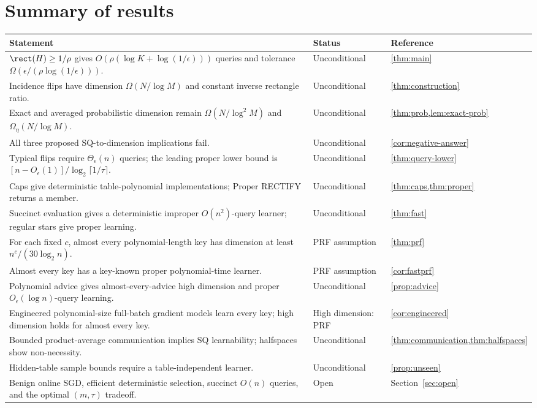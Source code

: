 \clearpage
\section*{Summary of results}
\begin{center}\small
\renewcommand{\arraystretch}{1.5}
\begin{tabularx}{\linewidth}{@{}X p{.20\linewidth}p{.14\linewidth}@{}}\toprule
Statement & Status & Reference\\\midrule
$\rect(H)\ge1/\rho$ gives $O(\rho(\log K+\log(1/\epsilon)))$ queries and tolerance $\Omega(\epsilon/(\rho\log(1/\epsilon)))$. & Unconditional & \cref{thm:main}\\
Incidence flips have dimension $\Omega(N/\log M)$ and constant inverse rectangle ratio. & Unconditional & \cref{thm:construction}\\
Exact and averaged probabilistic dimension remain $\Omega(N/\log^2M)$ and $\Omega_\eta(N/\log M)$. & Unconditional & \cref{thm:prob,lem:exact-prob}\\
All three proposed SQ-to-dimension implications fail. & Unconditional & \cref{cor:negative-answer}\\
Typical flips require $\Theta_\epsilon(n)$ queries; the leading proper lower bound is $[n-O_\epsilon(1)]/\log_2\lceil1/\tau\rceil$. & Unconditional & \cref{thm:query-lower}\\
Caps give deterministic table-polynomial implementations; Proper RECTIFY returns a member. & Unconditional & \cref{thm:caps,thm:proper}\\
Succinct evaluation gives a deterministic improper $O(n^2)$-query learner; regular stars give proper learning. & Unconditional & \cref{thm:fast}\\
For each fixed $c$, almost every polynomial-length key has dimension at least $n^c/(30\log_2 n)$. & PRF assumption & \cref{thm:prf}\\
Almost every key has a key-known proper polynomial-time learner. & PRF assumption & \cref{cor:fastprf}\\
Polynomial advice gives almost-every-advice high dimension and proper $O_\epsilon(\log n)$-query learning. & Unconditional & \cref{prop:advice}\\
Engineered polynomial-size full-batch gradient models learn every key; high dimension holds for almost every key. & High dimension: PRF & \cref{cor:engineered}\\
Bounded product-average communication implies SQ learnability; halfspaces show non-necessity. & Unconditional & \cref{thm:communication,thm:halfspaces}\\
Hidden-table sample bounds require a table-independent learner. & Unconditional & \cref{prop:unseen}\\
Benign online SGD, efficient deterministic selection, succinct $O(n)$ queries, and the optimal $(m,\tau)$ tradeoff. & Open & Section~\ref{sec:open}\\\bottomrule
\end{tabularx}
\end{center}

